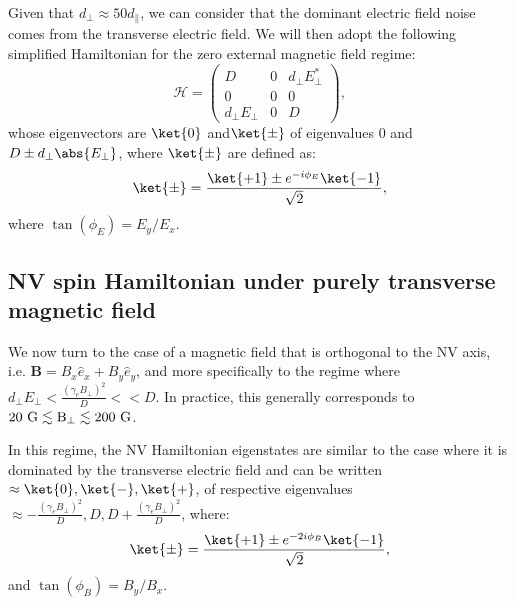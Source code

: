 \documentclass[a4paper, 11pt]{book}
\begin{document}
Given that $d_\perp \approx 50 d_\parallel$, we can consider that the dominant electric field noise comes from the transverse electric field. We will then adopt the following simplified Hamiltonian for the zero external magnetic field regime:
\begin{equation}
\mathcal{H}=\begin{pmatrix}
D&0&d_\perp E_\perp^* \\
0&0&0 \\
d_\perp E_\perp &0&D
\end{pmatrix},
\end{equation}
whose eigenvectors are $\ket{0}$ and$\ket{\pm}$ of eigenvalues 0 and $D\pm d_\perp \abs{E_\perp}$, where $\ket{\pm}$ are defined as:
\begin{equation}
\ket{\pm}=\frac{\ket{+1}\pm e^{-i\phi_E}\ket{-1}}{\sqrt{2}},
\end{equation}
where $\tan(\phi_E)=E_y/E_x$.

\subsection{NV spin Hamiltonian under purely transverse magnetic field}
\label{sec B transverse}

We now turn to the case of a magnetic field that is orthogonal to the NV axis, i.e. $\mathbf{B}=B_x \hat{e}_x + B_y \hat e_y$, and more specifically to the regime where $d_\perp E_\perp < \frac{(\gamma_e B_\perp)^2}{D} << D$. In practice, this generally corresponds to $20\ \rm G \lesssim B_\perp \lesssim 200\ \rm G$.

In this regime, the NV Hamiltonian eigenstates are similar to the case where it is dominated by the transverse electric field and can be written $\approx \ket{0}, \ket{-}, \ket{+}$\citep{qiu2021nuclear, qiu2022nanoscale}, of respective eigenvalues $\approx -\frac{(\gamma_e B_\perp)^2}{D},D,D+\frac{(\gamma_e B_\perp)^2}{D}$,  where:
\begin{equation}
\ket{\pm}=\frac{\ket{+1}\pm e^{-2i\phi_B}\ket{-1}}{\sqrt{2}},
\end{equation}
and $\tan(\phi_B)=B_y/B_x$.
\end{document}
